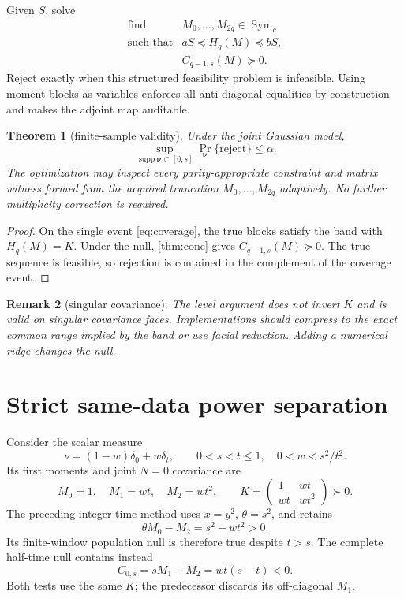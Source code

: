 \documentclass[11pt]{article}
\newtheorem{theorem}{Theorem}[section]
\newtheorem{remark}[theorem]{Remark}
\newcommand{\Sym}{\operatorname{Sym}}
\newcommand{\supp}{\operatorname{supp}}
\begin{document}
Given $S$, solve
\[
\begin{array}{ll}
\text{find}&M_0,\ldots,M_{2q}\in\Sym_c\\[1mm]
\text{such that}&aS\preceq H_q(M)\preceq bS,\\
&C_{q-1,s}(M)\succeq0.
\end{array}                                                        \tag{4.5}
\]
Reject exactly when this structured feasibility problem is infeasible.
Using moment blocks as variables enforces all anti-diagonal equalities by
construction and makes the adjoint map auditable.

\begin{theorem}[finite-sample validity]\label{thm:level}
Under the joint Gaussian model,
\[
 \sup_{\supp\bm\nu\subset[0,s]}
 \Pr_{\bm\nu}\{\text{reject}\}\le\alpha.                           \tag{4.6}
\]
The optimization may inspect every parity-appropriate constraint and matrix
witness formed from the acquired truncation $M_0,\ldots,M_{2q}$ adaptively.
No further multiplicity correction is required.
\end{theorem}

\begin{proof}
On the single event \cref{eq:coverage}, the true blocks satisfy the band with
$H_q(M)=K$.  Under the null, \cref{thm:cone} gives
$C_{q-1,s}(M)\succeq0$.  The true sequence is feasible, so rejection is
contained in the complement of the coverage event.
\end{proof}

\begin{remark}[singular covariance]
The level argument does not invert $K$ and is valid on singular covariance
faces.  Implementations should compress to the exact common range implied by
the band or use facial reduction.  Adding a numerical ridge changes the null.
\end{remark}

\section{Strict same-data power separation}\label{sec:strict}

Consider the scalar measure
\[
 \nu=(1-w)\delta_0+w\delta_t,\qquad
 0<s<t\le1,\quad0<w<s^2/t^2.                                     \tag{5.1}\label{eq:twoatom}
\]
Its first moments and joint $N=0$ covariance are
\[
 M_0=1,\quad M_1=wt,\quad M_2=wt^2,\qquad
 K=\begin{pmatrix}1&wt\\wt&wt^2\end{pmatrix}\succ0.               \tag{5.2}
\]
The preceding integer-time method uses $x=y^2$, $\theta=s^2$, and retains
\[
 \theta M_0-M_2=s^2-wt^2>0.                                      \tag{5.3}\label{eq:oldmargin}
\]
Its finite-window population null is therefore true despite $t>s$.  The
complete half-time null contains instead
\[
 C_{0,s}=sM_1-M_2=wt(s-t)<0.                                     \tag{5.4}
\]
Both tests use the same $K$; the predecessor discards its off-diagonal
$M_1$.
\end{document}
